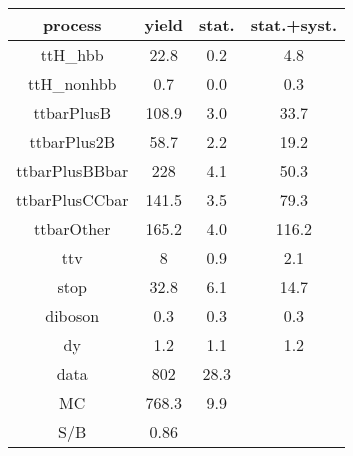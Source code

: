 \begin{tabular}{cccc}
\hline
    process     &  yield  &  stat.  &  stat.+syst.  \\
\hline
    ttH\_hbb     &  22.8   &   0.2   &      4.8      \\
   ttH\_nonhbb   &   0.7   &   0.0   &      0.3      \\
   ttbarPlusB   &  108.9  &   3.0   &     33.7      \\
  ttbarPlus2B   &  58.7   &   2.2   &     19.2      \\
 ttbarPlusBBbar &   228   &   4.1   &     50.3      \\
 ttbarPlusCCbar &  141.5  &   3.5   &     79.3      \\
   ttbarOther   &  165.2  &   4.0   &     116.2     \\
      ttv       &    8    &   0.9   &      2.1      \\
      stop      &  32.8   &   6.1   &     14.7      \\
    diboson     &   0.3   &   0.3   &      0.3      \\
       dy       &   1.2   &   1.1   &      1.2      \\
      data      &   802   &  28.3   &               \\
       MC       &  768.3  &   9.9   &               \\
      S/B       &  0.86   &         &               \\
\hline
\end{tabular}